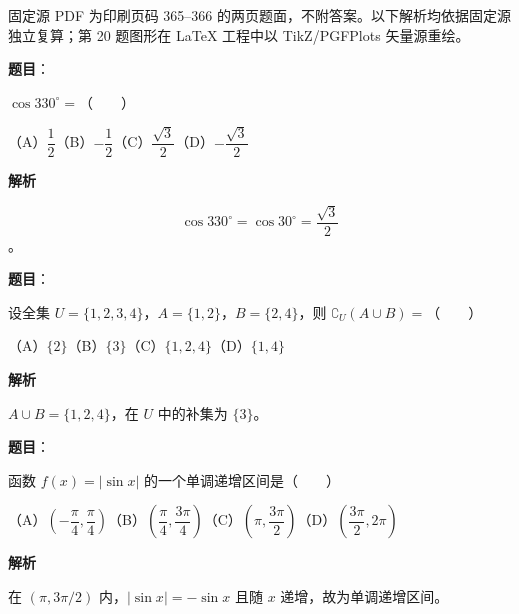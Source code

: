 

\begin{gktip}
固定源 PDF 为印刷页码 365–366 的两页题面，不附答案。以下解析均依据固定源独立复算；第 20 题图形在 LaTeX 工程中以 TikZ/PGFPlots 矢量源重绘。
\end{gktip}

\begin{answer}

\textbf{题目}：

$\cos330^\circ=$\mbox{（　　）}

（A）$\dfrac12$\quad（B）$-\dfrac12$\quad（C）$\dfrac{\sqrt3}{2}$\quad（D）$-\dfrac{\sqrt3}{2}$

\textbf{解析}

\nopagebreak[4]
\[
\cos330^\circ=\cos30^\circ=\frac{\sqrt3}{2}
\]
。


\end{answer}
\begin{answer}

\textbf{题目}：

设全集 $U=\{1,2,3,4\}$，$A=\{1,2\}$，$B=\{2,4\}$，则 $\complement_U(A\cup B)=$\mbox{（　　）}

（A）$\{2\}$\quad（B）$\{3\}$\quad（C）$\{1,2,4\}$\quad（D）$\{1,4\}$

\textbf{解析}

$A\cup B=\{1,2,4\}$，在 $U$ 中的补集为 $\{3\}$。


\end{answer}
\begin{answer}

\textbf{题目}：

函数 $f(x)=|\sin x|$ 的一个单调递增区间是\mbox{（　　）}

（A）$\left(-\dfrac\pi4,\dfrac\pi4\right)$\quad（B）$\left(\dfrac\pi4,\dfrac{3\pi}4\right)$\quad（C）$\left(\pi,\dfrac{3\pi}2\right)$\quad（D）$\left(\dfrac{3\pi}2,2\pi\right)$

\textbf{解析}

在 $(\pi,3\pi/2)$ 内，$|\sin x|=-\sin x$ 且随 $x$ 递增，故为单调递增区间。


\end{answer}
